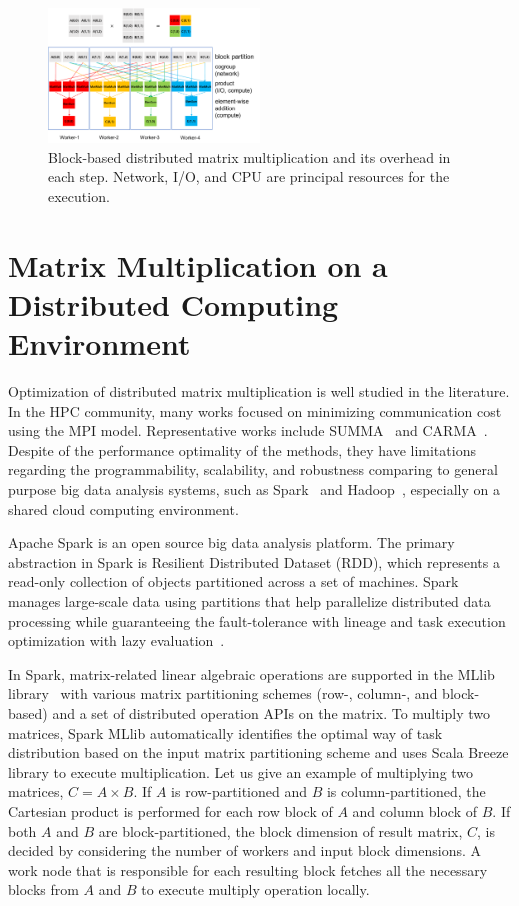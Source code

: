 \documentclass[10pt, conference, compsocconf]{IEEEtran}
\begin{document}
\begin{figure}[ht]
	\centering\includegraphics[width=0.5\textwidth]{figures/matmult-overhead-non-square-1.pdf}\caption{Block-based distributed matrix multiplication and its overhead in each step. Network, I/O, and CPU are principal resources for the execution.}\label{fig:matmul-with-overhead}
\end{figure}

\section{Matrix Multiplication on a Distributed Computing Environment}\label{sec:distributed-matrix-computation}
Optimization of distributed matrix multiplication is well studied in the literature. In the HPC community, many works focused on minimizing communication cost using the MPI model. Representative works include SUMMA~\cite{summa} and CARMA~\cite{carma}. Despite of the performance optimality of the methods, they have limitations regarding the programmability, scalability, and robustness comparing to general purpose big data analysis systems, such as Spark~\cite{spark} and Hadoop~\cite{hadoop}, especially on a shared cloud computing environment.

Apache Spark is an open source big data analysis platform. The primary abstraction in Spark is Resilient Distributed Dataset (RDD), which represents a read-only collection of objects partitioned across a set of machines. Spark manages large-scale data using partitions that help parallelize distributed data processing while guaranteeing the fault-tolerance with lineage and task execution optimization with lazy evaluation~\cite{spark}.

In Spark, matrix-related linear algebraic operations are supported in the MLlib library~\cite{spark-mm} with various matrix partitioning schemes (row-, column-, and block-based) and a set of distributed operation APIs on the matrix. To multiply two matrices, Spark MLlib automatically identifies the optimal way of task distribution based on the input matrix partitioning scheme and uses Scala Breeze library to execute multiplication. Let us give an example of multiplying two matrices, $C = A \times B$. If $A$ is row-partitioned and $B$ is column-partitioned, the Cartesian product is performed for each row block of $A$ and column block of $B$. If both $A$ and $B$ are block-partitioned, the block dimension of result matrix, $C$, is decided by considering the number of workers and input block dimensions. A work node that is responsible for each resulting block fetches all the necessary blocks from $A$ and $B$ to execute multiply operation locally.
\end{document}

